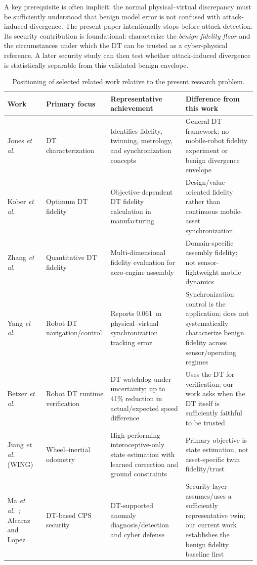 \documentclass[conference]{IEEEtran}
\begin{document}
A key prerequisite is often implicit: the normal physical--virtual discrepancy must be sufficiently understood that benign model error is not confused with attack-induced divergence. The present paper intentionally stops before attack detection. Its security contribution is foundational: characterize the \emph{benign fidelity floor} and the circumstances under which the DT can be trusted as a cyber-physical reference. A later security study can then test whether attack-induced divergence is statistically separable from this validated benign envelope.

\begin{table}[t]
\centering
\caption{Positioning of selected related work relative to the present research problem.}
\label{tab:related}
\footnotesize
\begin{tabular}{p{2.6cm} p{3.0cm} p{4.0cm} p{5.0cm}}
\toprule
\textbf{Work} & \textbf{Primary focus} & \textbf{Representative achievement} & \textbf{Difference from this work} \\
\midrule
Jones \emph{et al.}~\cite{jones2020dt} & DT characterization & Identifies fidelity, twinning, metrology, and synchronization concepts & General DT framework; no mobile-robot fidelity experiment or benign divergence envelope \\
Kober \emph{et al.}~\cite{kober2023fidelity} & Optimum DT fidelity & Objective-dependent DT fidelity calculation in manufacturing & Design/value-oriented fidelity rather than continuous mobile-asset synchronization \\
Zhang \emph{et al.}~\cite{zhang2025fidelity} & Quantitative DT fidelity & Multi-dimensional fidelity evaluation for aero-engine assembly & Domain-specific assembly fidelity; not sensor-lightweight mobile dynamics \\
Yang \emph{et al.}~\cite{yang2025omr} & Robot DT navigation/control & Reports 0.061~m physical--virtual synchronization tracking error & Synchronization control is the application; does not systematically characterize benign fidelity across sensor/operating regimes \\
Betzer \emph{et al.}~\cite{betzer2024runtime} & Robot DT runtime verification & DT watchdog under uncertainty; up to 41\% reduction in actual/expected speed difference & Uses the DT for verification; our work asks when the DT itself is sufficiently faithful to be trusted \\
Jiang \emph{et al.} (WING)~\cite{jiang2025wing} & Wheel--inertial odometry & High-performing interoceptive-only state estimation with learned correction and ground constraints & Primary objective is state estimation, not asset-specific twin fidelity/trust \\
Ma \emph{et al.}~\cite{ma2024cps}; Alcaraz and Lopez~\cite{alcaraz2024anomaly} & DT-based CPS security & DT-supported anomaly diagnosis/detection and cyber defense & Security layer assumes/uses a sufficiently representative twin; our current work establishes the benign fidelity baseline first \\
\bottomrule
\end{tabular}
\end{table}
\end{document}
